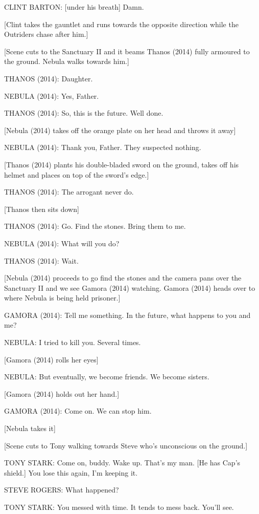CLINT BARTON: [under his breath] Damn.

[Clint takes the gauntlet and runs towards the opposite direction while the Outriders chase after him.]

[Scene cuts to the Sanctuary II and it beams Thanos (2014) fully armoured to the ground. Nebula walks towards him.]

THANOS (2014): Daughter.

NEBULA (2014): Yes, Father.

THANOS (2014): So, this is the future. Well done.

[Nebula (2014) takes off the orange plate on her head and throws it away]

NEBULA (2014): Thank you, Father. They suspected nothing.

[Thanos (2014) plants his double-bladed sword on the ground, takes off his helmet and places on top of the sword's edge.]

THANOS (2014): The arrogant never do.

[Thanos then sits down]

THANOS (2014): Go. Find the stones. Bring them to me.

NEBULA (2014): What will you do?

THANOS (2014): Wait.

[Nebula (2014) proceeds to go find the stones and the camera pans over the Sanctuary II and we see Gamora (2014) watching. Gamora (2014) heads over to where Nebula is being held prisoner.]

GAMORA (2014): Tell me something. In the future, what happens to you and me?

NEBULA: I tried to kill you. Several times.

[Gamora (2014) rolls her eyes]

NEBULA: But eventually, we become friends. We become sisters.

[Gamora (2014) holds out her hand.]

GAMORA (2014): Come on. We can stop him.

[Nebula takes it]

[Scene cuts to Tony walking towards Steve who's unconscious on the ground.]

TONY STARK: Come on, buddy. Wake up. That's my man. [He has Cap's shield.] You lose this again, I'm keeping it.

STEVE ROGERS: What happened?

TONY STARK: You messed with time. It tends to mess back. You'll see.

